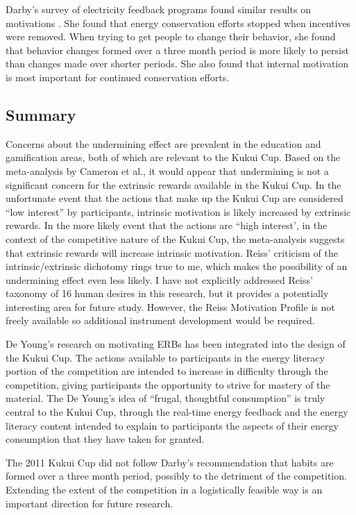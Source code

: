 Darby's survey of electricity feedback programs found similar results on motivations \cite{darby-review-2006}. She found that energy conservation efforts stopped when incentives were removed. When trying to get people to change their behavior, she found that behavior changes formed over a three month period is more likely to persist than changes made over shorter periods. She also found that internal motivation is most important for continued conservation efforts.


\subsection{Summary}

Concerns about the undermining effect are prevalent in the education and gamification areas, both of which are relevant to the Kukui Cup. Based on the meta-analysis by Cameron et al., it would appear that undermining is not a significant concern for the extrinsic rewards available in the Kukui Cup. In the unfortunate event that the actions that make up the Kukui Cup are considered ``low interest'' by participants, intrinsic motivation is likely increased by extrinsic rewards. In the more likely event that the actions are ``high interest', in the context of the competitive nature of the Kukui Cup, the meta-analysis suggests that extrinsic rewards will increase intrinsic motivation. Reiss' criticism of the intrinsic/extrinsic dichotomy rings true to me, which makes the possibility of an undermining effect even less likely. I have not explicitly addressed Reiss' taxonomy of 16 human desires in this research, but it provides a potentially interesting area for future study. However, the Reiss Motivation Profile is not freely available so additional instrument development would be required.

De Young's research on motivating ERBs has been integrated into the design of the Kukui Cup. The actions available to participants in the energy literacy portion of the competition are intended to increase in difficulty through the competition, giving participants the opportunity to strive for mastery of the material. The De Young's idea of ``frugal, thoughtful consumption'' is truly central to the Kukui Cup, through the real-time energy feedback and the energy literacy content intended to explain to participants the aspects of their energy consumption that they have taken for granted.

The 2011 Kukui Cup did not follow Darby's recommendation that habits are formed over a three month period, possibly to the detriment of the competition. Extending the extent of the competition in a logistically feasible way is an important direction for future research.



